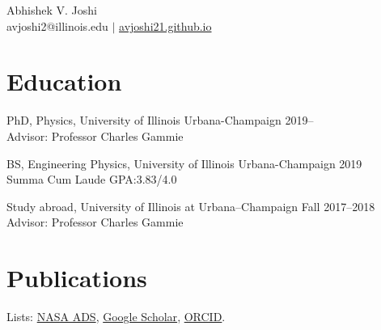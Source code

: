 \documentclass[12pt]{article}
\begin{document}
\begin{center}
{\Large Abhishek V. Joshi}\\\vspace{0.5em}
avjoshi2@illinois.edu $|$ \href{https://avjoshi21.github.io}{avjoshi21.github.io}
\end{center}

\section*{Education}
PhD, Physics, University of Illinois Urbana-Champaign \hfill 2019--\\
Advisor: Professor Charles Gammie

BS, Engineering Physics, University of Illinois Urbana-Champaign \hfill 2019\\
Summa Cum Laude \hfill GPA:3.83/4.0

Study abroad, University of Illinois at Urbana--Champaign \hfill Fall 2017--2018\\
Advisor: Professor Charles Gammie

\section*{Publications}
Lists: \href{\adslibrary}{NASA ADS}, \href{\googlescholar}{Google Scholar}, \href{https://orcid.org/0000-0003-0381-1039}{ORCID}.

\begin{etaremune}[leftmargin=1.25em]

  
\end{etaremune}
\end{document}
